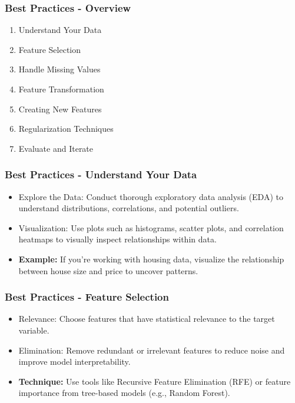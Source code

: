 \documentclass[aspectratio=169]{beamer}
\begin{document}
\begin{frame}
    \frametitle{Best Practices - Overview}
    \begin{enumerate}
        \item Understand Your Data
        \item Feature Selection
        \item Handle Missing Values
        \item Feature Transformation
        \item Creating New Features
        \item Regularization Techniques
        \item Evaluate and Iterate
    \end{enumerate}
\end{frame}

\begin{frame}
    \frametitle{Best Practices - Understand Your Data}
    \begin{itemize}
        \item Explore the Data: Conduct thorough exploratory data analysis (EDA) to understand distributions, correlations, and potential outliers.
        \item Visualization: Use plots such as histograms, scatter plots, and correlation heatmaps to visually inspect relationships within data.
        \item \textbf{Example:} If you're working with housing data, visualize the relationship between house size and price to uncover patterns.
    \end{itemize}
\end{frame}

\begin{frame}
    \frametitle{Best Practices - Feature Selection}
    \begin{itemize}
        \item Relevance: Choose features that have statistical relevance to the target variable.
        \item Elimination: Remove redundant or irrelevant features to reduce noise and improve model interpretability.
        \item \textbf{Technique:} Use tools like Recursive Feature Elimination (RFE) or feature importance from tree-based models (e.g., Random Forest).
    \end{itemize}
\end{frame}
\end{document}
